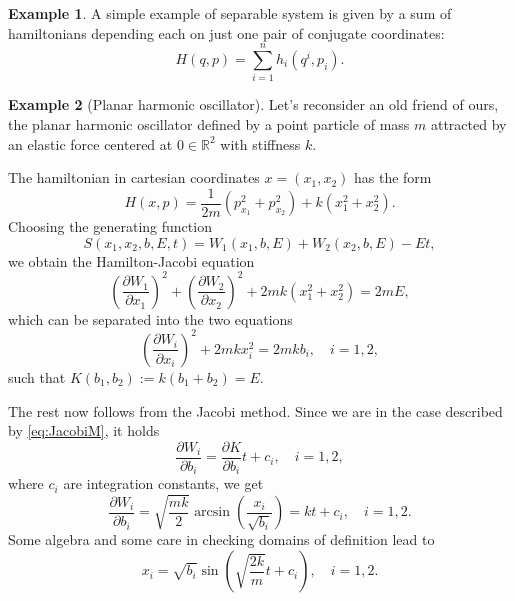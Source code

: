 \documentclass[english,fontsize=11pt,paper=b5]{scrbook}
\theoremstyle{definition}
\newtheorem{example}{Example}[chapter]
\begin{document}
    \begin{example}
      A simple example of separable system is given by a sum of hamiltonians depending each on just one pair of conjugate coordinates:
      \begin{equation}
        H(q,p) = \sum_{i=1}^n h_i(q^i, p_i).
      \end{equation}
    \end{example}

    \begin{example}[Planar harmonic oscillator]\label{ex:integrabilitypho}
      Let's reconsider an old friend of ours, the planar harmonic oscillator defined by a point particle of mass $m$ attracted by an elastic force centered at $0\in\mathbb{R}^2$ with stiffness $k$.

      The hamiltonian in cartesian coordinates $x=(x_1, x_2)$ has the form
      \begin{equation}
        H(x,p) = \frac{1}{2m}(p_{x_1}^2 + p_{x_2}^2) + k(x_1^2 + x_2^2).
      \end{equation}
      Choosing the generating function
      \begin{equation}
        S(x_1, x_2, b, E, t) = W_1(x_1, b, E) + W_2(x_2, b, E) - E t,
      \end{equation}
      we obtain the Hamilton-Jacobi equation
      \begin{equation}
        \left(\frac{\partial W_1}{\partial x_1}\right)^2
        + \left(\frac{\partial W_2}{\partial x_2}\right)^2
        + 2m k (x_1^2 + x_2^2) = 2m E,
      \end{equation}
      which can be separated into the two equations
      \begin{equation}
        \left(\frac{\partial W_i}{\partial x_i}\right)^2
        + 2m k x_i^2  = 2m k b_i, \quad i=1,2,
      \end{equation}
      such that $K(b_1,b_2) := k(b_1 + b_2) = E$.

      The rest now follows from the Jacobi method.
      Since we are in the case described by \eqref{eq:JacobiM}, it holds
      \begin{equation}
        \frac{\partial W_i}{\partial b_i} = \frac{\partial K}{\partial b_i}t + c_i, \quad i=1,2,
      \end{equation}
      where $c_i$ are integration constants, we get
      \begin{equation}
        \frac{\partial W_i}{\partial b_i} = \sqrt{\frac{mk}{2}}\arcsin\left(\frac{x_i}{\sqrt{b_i}}\right) = kt + c_i, \quad i=1,2.
      \end{equation}
      Some algebra and some care in checking domains of definition lead to
      \begin{equation}
        x_i = \sqrt{b_i} \sin\left(\sqrt{\frac{2k}{m}} t + c_i\right), \quad i=1,2.
      \end{equation}


\end{example}
\end{document}
